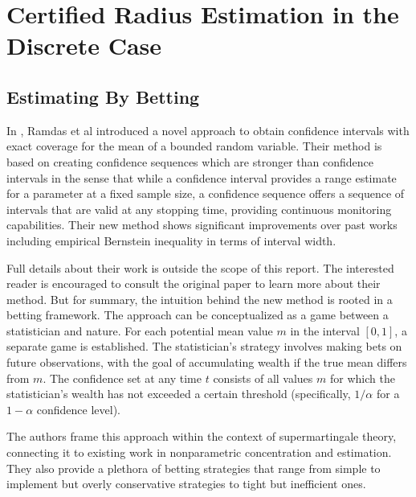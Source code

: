 \section{Certified Radius Estimation in the Discrete Case}\label{sec:continuous}

\subsection{Estimating By Betting}\label{subsec:estimating-by-betting}
In , Ramdas et al introduced a novel approach to obtain confidence intervals with exact coverage for the mean of a bounded random variable.
Their method is based on creating confidence sequences which are stronger than confidence intervals in the sense that while a confidence interval provides a range estimate for a parameter at a fixed sample size, a confidence sequence offers a sequence of intervals that are valid at any stopping time, providing continuous monitoring capabilities.
Their new method shows significant improvements over past works including empirical Bernstein inequality in terms of interval width.

Full details about their work is outside the scope of this report.
The interested reader is encouraged to consult the original paper to learn more about their method.
But for summary, the intuition behind the new method is rooted in a betting framework.
The approach can be conceptualized as a game between a statistician and nature.
For each potential mean value $m$ in the interval $[0,1]$, a separate game is established.
The statistician's strategy involves making bets on future observations, with the goal of accumulating wealth if the true mean differs from $m$.
The confidence set at any time $t$ consists of all values $m$ for which the statistician's wealth has not exceeded a certain threshold (specifically, $1/\alpha$ for a $1-\alpha$ confidence level).

The authors frame this approach within the context of supermartingale theory, connecting it to existing work in nonparametric concentration and estimation.
They also provide a plethora of betting strategies that range from simple to implement but overly conservative strategies to tight but inefficient ones.

